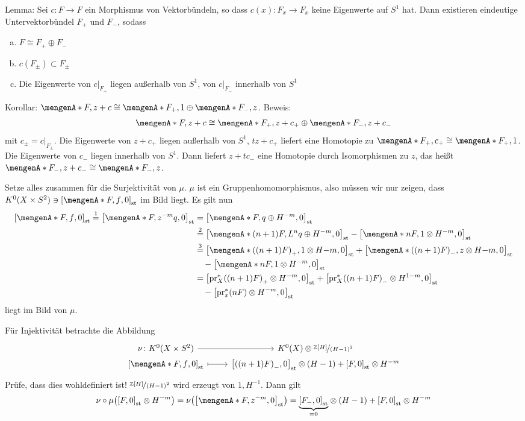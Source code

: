 \begin{enumerate}[1.]
	Lemma: Sei $c \colon F \to F$ ein Morphismus von Vektorbündeln, so dass $c(x) \colon F_x \to F_x$ keine Eigenwerte auf $S^1$ hat. Dann existieren eindeutige 
	Untervektorbündel $F_+$ und $F_-$, sodass 
	\begin{enumerate}[a)]
		\item $F \cong F_+ \oplus F_-$
		\item $c(F_\pm) \subset F_\pm$
		\item Die Eigenwerte von $c|_{F_+}$ liegen außerhalb von $S^1$, von $c|_{F_-}$ innerhalb von $S^1$
	\end{enumerate}
	
	Korollar: $\set{F,  z+c} \cong \set{F_+,1} \oplus \set{F_-,z}$. Beweis: 
	\[
		\set{F, z+c} \cong \set{F_+, z+ c_+} \oplus \set{F_-, z+ c_-} 
	\]
	mit $c_\pm = c|_{F_\pm}$. Die Eigenwerte von $z+ c_+$ liegen außerhalb von $S^1$, $tz + c_+$ liefert eine Homotopie zu $\set{F_+, c_+} \cong \set{F_+,1}$.
	Die Eigenwerte von $c_-$ liegen innerhalb von $S^1$. Dann liefert $z + t c_-$ eine Homotopie durch Isomorphismen zu $z$, das heißt $\set{F_-, z + c_-} \cong\set{F_-,z}$.
	\bewende
\end{enumerate}
Setze alles zusammen für die Surjektivität von $\mu$. $\mu$ ist ein Gruppenhomomorphismus, also müssen wir nur zeigen, dass 
$K^0(X \times S^2)\ni \benbrace*{\set{F,f},0 }_\st $ im Bild liegt. Es gilt nun
\begin{align*}
	\benbrace*{\set{F,f},0 }_\st \stackrel{1}{=} \benbrace*{\set{F, z^{-m} q},0 }_\st &= \benbrace*{\set{F,q} \oplus H^{-m},0 }_\st \\
	&\stackrel{2}{=} \benbrace*{\set{(n+1) F, L^n q} \oplus H^{-m},0 }_\st -  \benbrace*{\set{n F,1} \otimes H^{-m}, 0 }_\st \\
	&\stackrel{3}{=} \benbrace*{ \set{\enbrace*{(n+1)F}_+,1} \otimes H{-m},0 }_\st + \benbrace*{ \set{\enbrace*{(n+1)F}_-,z }\otimes H{-m},0 }_\st \\
	&\quad - \benbrace*{\set{n F,1} \otimes H^{-m},0 }_\st   \\
	&=  \benbrace*{\pr_X^* \enbrace*{(n+1)F}_+ \otimes H^{-m},0 }_\st + \benbrace*{\pr_X^* \enbrace*{(n+1)F}_- \otimes H^{1-m},0 }_\st  \\
	&\quad - \benbrace*{\pr_x^*(n F) \otimes H^{-m},0}_\st 
\end{align*}
liegt im Bild von $\mu$.

Für Injektivität betrachte die Abbildung 
\[
	\begin{tikzcd}[row sep=0.0em]
		\nu \colon K^0(X \times S^2) \rar & K^0(X)\otimes \nicefrac{\mathds{Z}[H]}{(H-1)^2} \\
		\benbrace*{\set{F,f},0 }_\st \rar[mapsto] & \benbrace*{ \enbrace*{(n+1)F}_- ,0 }_\st \otimes (H-1) + \benbrace*{F ,0}_\st \otimes H^{-m} 
	\end{tikzcd}
\]
Prüfe, dass dies wohldefiniert ist! $\nicefrac{\mathds{Z}[H]}{(H-1)^2}$ wird erzeugt von $1, H ^{-1}$. Dann gilt
\begin{align*}
	\nu \circ \mu \enbrace*{ \benbrace*{F,0}_\st \otimes H^{-m}} = \nu \enbrace*{ \benbrace*{\set{F,z^{-m}},0 }_\st } = \Underbrace{\benbrace*{F_-,0}_\st}{=0}  \otimes (H-1)
	+ \benbrace*{F,0}_\st \otimes H^{-m} 
\end{align*}

